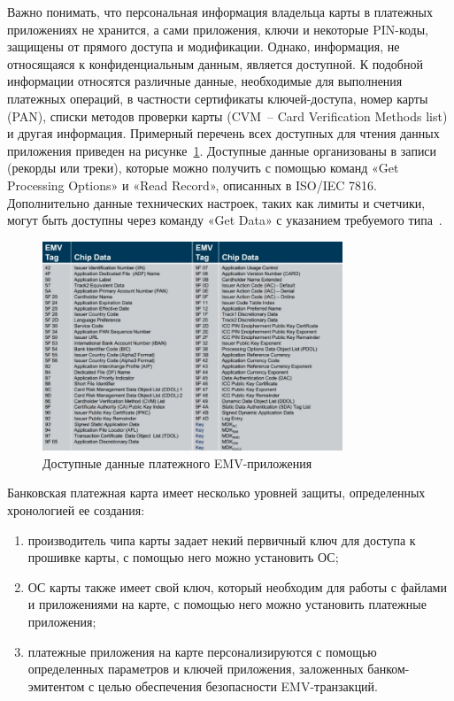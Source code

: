Важно понимать, что персональная информация владельца карты в платежных приложениях не хранится, а сами приложения, ключи и некоторые PIN-коды, защищены от прямого доступа и модификации.
Однако, информация, не относящаяся к конфиденциальным данным, является доступной.
К подобной информации относятся различные данные, необходимые для выполнения платежных операций, в частности сертификаты ключей-доступа, номер карты (PAN), списки методов проверки карты (CVM~-- Card Verification Methods list) и другая информация.
Примерный перечень всех доступных для чтения данных приложения приведен на рисунке~\ref{fig:emv_available_data}.
Доступные данные организованы в записи (рекорды или треки), которые можно получить с помощью команд «Get Processing Options» и «Read Record», описанных  в ISO/IEC 7816.
Дополнительно данные технических настроек, таких как лимиты и счетчики, могут быть доступны через команду «Get Data» с указанием требуемого типа~\cite{emv_card_mechanism}.

\begin{figure}[H]
    \centering
    \includegraphics[width=0.8\textwidth]{images/research/emv_available_data}
    \caption{\centering Доступные данные платежного EMV-приложения}
    \label{fig:emv_available_data}
\end{figure}

Банковская платежная карта имеет несколько уровней защиты, определенных хронологией ее создания:

\begin{enumerate}
    \item производитель чипа карты задает некий первичный ключ для доступа к прошивке карты, с помощью него можно установить ОС;
    \item ОС карты также имеет свой ключ, который необходим для работы с файлами и приложениями на карте, с помощью него можно установить платежные приложения;
    \item платежные приложения на карте персонализируются с помощью определенных параметров и ключей приложения, заложенных банком-эмитентом с целью обеспечения безопасности EMV-транзакций.
\end{enumerate}

